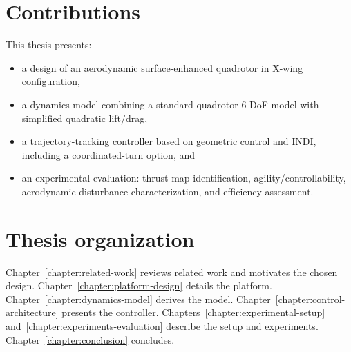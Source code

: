 \section{Contributions}
This thesis presents:
\begin{itemize}
  \item a design of an aerodynamic surface-enhanced quadrotor in X-wing configuration,
  \item a dynamics model combining a standard quadrotor 6-DoF model with simplified quadratic lift/drag,
  \item a trajectory-tracking controller based on geometric control and INDI, including a coordinated-turn option, and
  \item an experimental evaluation: thrust-map identification, agility/controllability, aerodynamic disturbance characterization, and efficiency assessment.
\end{itemize}

\section{Thesis organization}
Chapter~\ref{chapter:related-work} reviews related work and motivates the chosen design. Chapter~\ref{chapter:platform-design} details the platform. Chapter~\ref{chapter:dynamics-model} derives the model. Chapter~\ref{chapter:control-architecture} presents the controller. Chapters~\ref{chapter:experimental-setup} and~\ref{chapter:experiments-evaluation} describe the setup and experiments. Chapter~\ref{chapter:conclusion} concludes.
